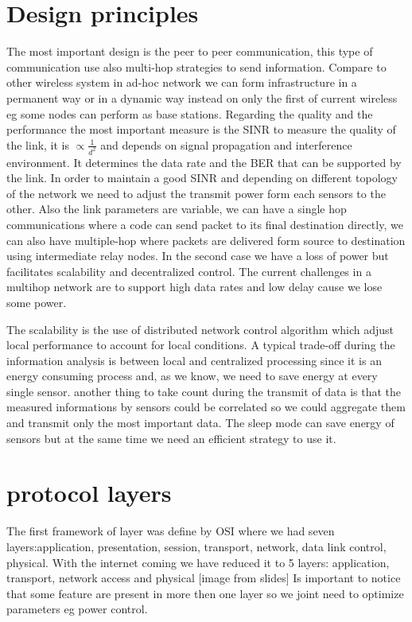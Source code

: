 \section{Design principles}
The most important design is the peer to peer communication, this type of communication use also multi-hop strategies to send information. Compare to other wireless system in ad-hoc network we can form infrastructure in a permanent way or in a dynamic way instead on only the first of current wireless eg some nodes can perform as base stations.
Regarding the quality and the performance the most important measure is the SINR to measure the quality of the link, it is $ \propto\frac{1}{d^2} $ and depends on signal propagation and interference environment. It determines the data rate and the BER that can be supported by the link. In order to maintain a good SINR and depending on different topology of the network we need to adjust the transmit power form each sensors to the other.
Also the link parameters are variable, we can have a single hop communications where a code can send packet to its final destination directly, we can also have multiple-hop where packets are delivered form source to destination using intermediate relay nodes. In the second case we have a loss of power but facilitates scalability and decentralized control. The current challenges in a multihop network are to support high data rates and low delay cause we lose some power.

The scalability is the use of distributed network control algorithm which adjust local performance to account for local conditions. A typical trade-off during the information analysis is between local and centralized processing since it is an energy consuming process and, as we know, we need to save energy at every single sensor. another thing to take count during the transmit of data is that the  measured informations by sensors could be correlated so we could aggregate them and transmit only the most important data. The sleep mode can save energy of sensors but at the same time we need an efficient strategy to use it.

\section{protocol layers}
The first framework of layer was define by OSI where we had seven layers:application, presentation, session, transport, network, data link control, physical. With the internet coming we have reduced it to 5 layers: application, transport, network access and physical [image from slides]
Is important to notice that some feature are present in more then one layer so we joint need to optimize parameters eg power control.

